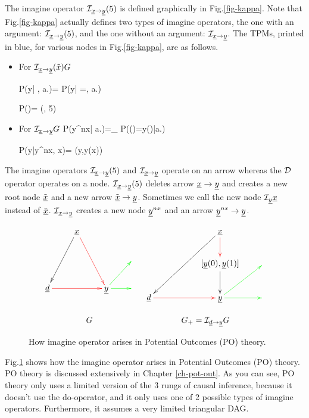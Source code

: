 The imagine operator  ${\cal I}_{{\underline{x}}\rightarrow {\underline{y}}}(5)$
is defined graphically in Fig.\ref{fig-kappa}.
Note that Fig.\ref{fig-kappa}
actually defines two types 
of imagine operators, the one
with an argument:
${\cal I}_{{\underline{x}}\rightarrow {\underline{y}}}(5)$,
and the one without an argument: 
${\cal I}_{{\underline{x}}\rightarrow {\underline{y}}}$.
The TPMs, printed in blue, 
for various nodes in
Fig.\ref{fig-kappa}, are as follows.



\begin{itemize}

\item
For ${\cal I}_{{\underline{x}}\rightarrow 
{\underline{y}}}(\tilde{x})G$

\beq\color{blue}
P(y| , a.)=
P(y| \rvx=, a.)
\eeq

\beq\color{blue}
P()=
\delta(, 5)
\eeq

\item
For ${\cal I}_{{\underline{x}}\rightarrow {\underline{y}}}G$
\beq\color{blue}
P(y^{nx}| a.)=\prod_{}
P(\rvy()=y()|a.)
\eeq

\beq\color{blue}
P(y|y^{nx}, x)=
\delta(y,y(x))
\eeq
\end{itemize}
The imagine operators 
${\cal I}_{{\underline{x}}\rightarrow{\underline{y}}}(5)$
and ${\cal I}_{{\underline{x}}\rightarrow{\underline{y}}}$
operate on an arrow
whereas the 
${\cal D}$ operator
 operates on a node.
${\cal I}_{{\underline{x}}\rightarrow{\underline{y}}}(5)$
deletes
arrow ${\underline{x}}\rightarrow{\underline{y}}$
and
creates a new root node 
$\tilde{{\underline{x}}}$
and a new arrow
$\tilde{{\underline{x}}}\rightarrow {\underline{y}}$.
Sometimes we call
the new node
${\cal I}_{\underline{y}}{\underline{x}}$
instead of
 $\tilde{{\underline{x}}}$. 
${\cal I}_{{\underline{x}}\rightarrow{\underline{y}}}$
creates 
a new node ${\underline{y}}^{nx}$
and an arrow ${\underline{y}}^{nx}\rightarrow {\underline{y}}$.



\begin{figure}[h!]
$$
\begin{array}{ccccc}
\xymatrix{
&\rvx\ar@[red][ddr]\ar[ddl]
\\
&&&
\\
\rvd\ar@[red][rr]
&
&\rvy\ar@[green][r]
\ar@[green][ur]
&
}
&
\xymatrix{
&&\rvx\ar[ddll]\ar@[red][d]
\\
&&[\rvy(0),\rvy(1)]\ar[d]
&
\\
\rvd\ar@[red][rr]
&
&\rvy\ar@[green][r]
\ar@[green][ur]
&
}
\\
\\
G&G_+=\cali_{\rvd\rarrow\rvy}G
\end{array}
$$
\caption{How 
 imagine operator 
arises in 
Potential Outcomes (PO)
theory.
} 
\label{fig-counterf-G-im-y0-y1}
\end{figure}
Fig.\ref{fig-counterf-G-im-y0-y1}
shows how the
imagine operator arises
in Potential Outcomes (PO) theory.
PO theory is discussed extensively
in Chapter \ref{ch-pot-out}.
As you can see, PO theory
only uses a limited version
of the 3 rungs
of causal inference, because it 
doesn't use the do-operator,
and it only uses one 
of 2 possible types of
imagine operators.
Furthermore,
it assumes a
very limited triangular DAG.


